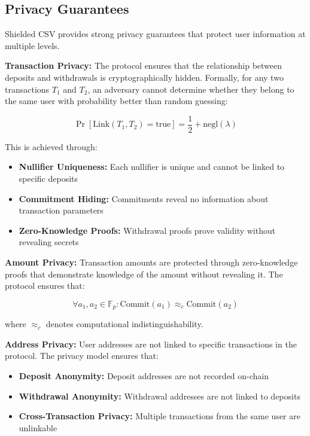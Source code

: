 \documentclass[11pt,a4paper]{article}
\begin{document}
\subsection{Privacy Guarantees}

Shielded CSV provides strong privacy guarantees that protect user information at multiple levels.

\textbf{Transaction Privacy:}
The protocol ensures that the relationship between deposits and withdrawals is cryptographically hidden. Formally, for any two transactions $T_1$ and $T_2$, an adversary cannot determine whether they belong to the same user with probability better than random guessing:

\begin{equation}
\Pr[\text{Link}(T_1, T_2) = \text{true}] = \frac{1}{2} + \text{negl}(\lambda)
\end{equation}

This is achieved through:
\begin{itemize}
    \item \textbf{Nullifier Uniqueness:} Each nullifier is unique and cannot be linked to specific deposits
    \item \textbf{Commitment Hiding:} Commitments reveal no information about transaction parameters
    \item \textbf{Zero-Knowledge Proofs:} Withdrawal proofs prove validity without revealing secrets
\end{itemize}

\textbf{Amount Privacy:}
Transaction amounts are protected through zero-knowledge proofs that demonstrate knowledge of the amount without revealing it. The protocol ensures that:

\begin{equation}
\forall a_1, a_2 \in \mathbb{F}_p: \text{Commit}(a_1) \approx_c \text{Commit}(a_2)
\end{equation}

where $\approx_c$ denotes computational indistinguishability.

\textbf{Address Privacy:}
User addresses are not linked to specific transactions in the protocol. The privacy model ensures that:

\begin{itemize}
    \item \textbf{Deposit Anonymity:} Deposit addresses are not recorded on-chain
    \item \textbf{Withdrawal Anonymity:} Withdrawal addresses are not linked to deposits
    \item \textbf{Cross-Transaction Privacy:} Multiple transactions from the same user are unlinkable
\end{itemize}
\end{document}

